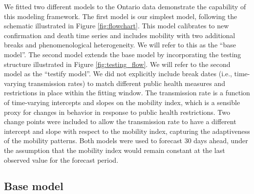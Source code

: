 \documentclass[12pt]{article}\usepackage[]{graphicx}\usepackage[]{color}
\begin{document}
We fitted two different models to the Ontario data demonstrate the capability of this modeling framework. The first model is our simplest model, following the schematic illustrated in Figure \ref{fig:flowchart}. This model calibrates to new confirmation and death time series and includes mobility with two additional breaks and phenomenological heterogeneity. We will refer to this as the ``base model''.
The second model extends the base model by incorporating the testing structure illustrated in Figure \ref{fig:testing_flow}. We will refer to the second model as the ``testify model''. 
We did not explicitly include break dates (i.e., time-varying transmission rates) to match different public health measures and restrictions in place within the fitting window. The transmission rate is a function of time-varying intercepts and slopes on the mobility index, which is a sensible proxy for changes in behavior in response to public health restrictions. Two change points were included to allow the transmission rate to have a different intercept and slope with respect to the mobility index, capturing the adaptiveness of the mobility patterns.
Both models were used to forecast 30 days ahead, under the assumption that the mobility index would remain constant at the last observed value for the forecast period.
 


\subsection{Base model}
\end{document}
